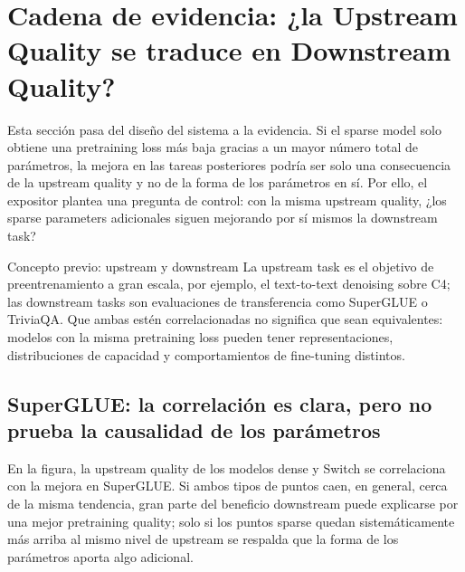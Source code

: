\section{Cadena de evidencia: ¿la Upstream Quality se traduce en Downstream Quality?}

Esta sección pasa del diseño del sistema a la evidencia. Si el sparse model solo obtiene una pretraining loss más baja gracias a un mayor número total de parámetros, la mejora en las tareas posteriores podría ser solo una consecuencia de la upstream quality y no de la forma de los parámetros en sí. Por ello, el expositor plantea una pregunta de control: con la misma upstream quality, ¿los sparse parameters adicionales siguen mejorando por sí mismos la downstream task?


\begin{knowledgebox}{Concepto previo: upstream y downstream}
La upstream task es el objetivo de preentrenamiento a gran escala, por ejemplo, el text-to-text denoising sobre C4; las downstream tasks son evaluaciones de transferencia como SuperGLUE o TriviaQA. Que ambas estén correlacionadas no significa que sean equivalentes: modelos con la misma pretraining loss pueden tener representaciones, distribuciones de capacidad y comportamientos de fine-tuning distintos.
\end{knowledgebox}

\subsection{SuperGLUE: la correlación es clara, pero no prueba la causalidad de los parámetros}

En la figura, la upstream quality de los modelos dense y Switch se correlaciona con la mejora en SuperGLUE. Si ambos tipos de puntos caen, en general, cerca de la misma tendencia, gran parte del beneficio downstream puede explicarse por una mejor pretraining quality; solo si los puntos sparse quedan sistemáticamente más arriba al mismo nivel de upstream se respalda que la forma de los parámetros aporta algo adicional.


